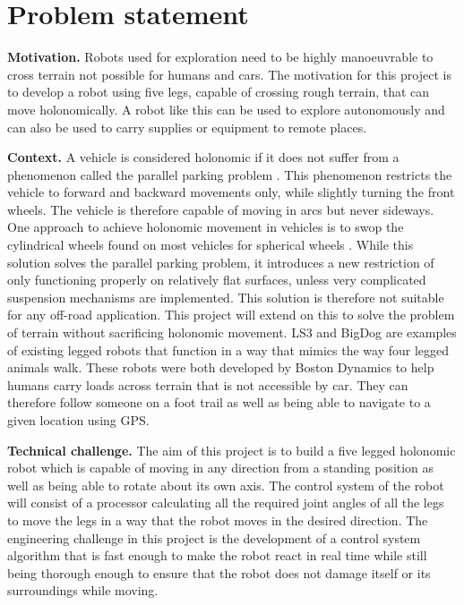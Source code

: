 
\section{Problem statement}

\textbf{Motivation.}
Robots used for exploration need to be highly manoeuvrable to cross terrain not possible for humans and cars. The motivation for this project is to develop a robot using five legs, capable of crossing rough terrain, that can move holonomically. A robot like this can be used to explore autonomously and can also be used to carry supplies or equipment to remote places.

\textbf{Context.}
A vehicle is considered holonomic if it does not suffer from a phenomenon called the parallel parking problem \cite{parallel:1}. This phenomenon restricts the vehicle to  forward and backward movements only, while slightly turning the front wheels. The vehicle is therefore capable of moving in arcs but never sideways. One approach to achieve holonomic movement in vehicles is to swop the cylindrical wheels found on most vehicles for spherical wheels \cite{Omni:1}. While this solution solves the parallel parking problem, it introduces  a new restriction of only functioning properly on relatively flat surfaces, unless very complicated suspension mechanisms are implemented. This solution is therefore not suitable for any off-road application. This project will extend on this to solve the problem of terrain without sacrificing holonomic movement. LS3 \cite{LS3} and BigDog  \cite{BigDog} are examples of existing legged robots that function in a way that mimics the way four legged animals walk. These robots were both developed by Boston Dynamics to help humans carry loads across terrain that is not accessible by car. They can therefore follow someone on a foot trail as well as being able to navigate to a given location using GPS.

\textbf{Technical challenge.}
The aim of this project is to build a five legged holonomic robot which is capable of moving in any direction from a standing position as well as being able to rotate about its own axis. The control system of the robot will consist of a processor calculating all the required joint angles of all the legs to move the legs in a way that the robot moves in the desired direction. The engineering challenge in this project is the development of a control system algorithm that is fast enough to make the robot react in real time while still being thorough enough  to ensure that the robot does not damage itself or its surroundings while moving.

